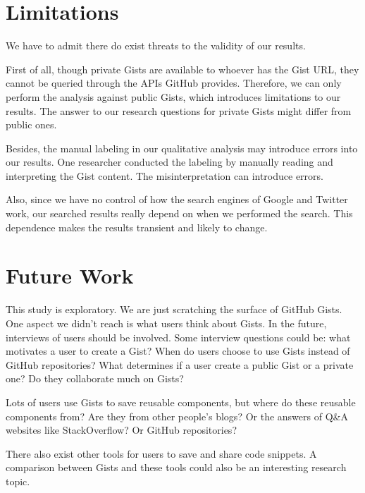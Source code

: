 
\section{Limitations}
We have to admit there do exist threats to the validity of our results. 

First of all, though private Gists are available to whoever has the Gist URL, they cannot be queried through the APIs GitHub provides. Therefore, we can only perform the analysis against public Gists, which introduces limitations to our results. The answer to our research questions for private Gists might differ from public ones.

Besides, the manual labeling in our qualitative analysis may introduce errors into our results. One researcher conducted the labeling by manually reading and interpreting the Gist content. The misinterpretation can introduce errors. 

Also, since we have no control of how the search engines of Google and Twitter work, our searched results really depend on when we performed the search. This dependence makes the results transient and likely to change. 

\section{Future Work}

This study is exploratory. We are just scratching the surface of GitHub Gists. One aspect we didn't reach is what users think about Gists. In the future, interviews of users should be involved. Some interview questions could be: what motivates a user to create a Gist? When do users choose to use Gists instead of GitHub repositories? What determines if a user create a public Gist or a private one? Do they collaborate much on Gists?

Lots of users use Gists to save reusable components, but where do these reusable components from? Are they from other people's blogs? Or the answers of Q\&A websites like StackOverflow? Or GitHub repositories? 

There also exist other tools for users to save and share code snippets. A comparison between Gists and these tools could also be an interesting research topic.